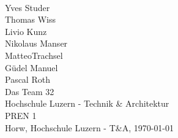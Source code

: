 \begin{titlepage}
    \begin{center}     
        \\
        \vspace*{1.2cm}
        Yves Studer\\
        Thomas Wiss\\
        Livio Kunz\\
        Nikolaus Manser\\
        MatteoTrachsel\\
        Güdel Manuel\\
        Pascal Roth\\
        \vspace*{1.2cm}
        {\Huge Das Team 32}\\
        \vspace*{1cm}
        \vspace*{10cm}
        {\normalsize Hochschule Luzern - Technik \& Architektur}\\
        {\normalsize PREN 1}\\
        \vspace*{0.6cm}
        {\normalsize Horw, Hochschule Luzern - T\&A, \today}\\
    \end{center}
\end{titlepage}

